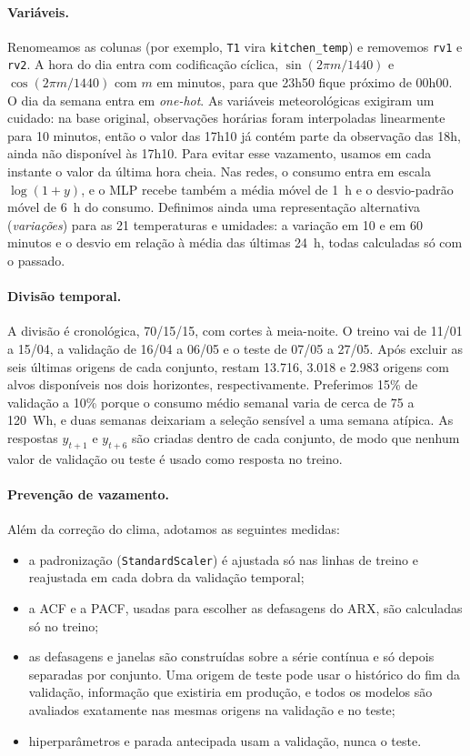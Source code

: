 \documentclass[11pt,a4paper]{article}
\begin{document}
\paragraph{Variáveis.} Renomeamos as colunas (por exemplo, \texttt{T1} vira \texttt{kitchen\_temp}) e removemos \texttt{rv1} e \texttt{rv2}. A hora do dia entra com codificação cíclica, $\sin(2\pi m/1440)$ e $\cos(2\pi m/1440)$ com $m$ em minutos, para que 23h50 fique próximo de 00h00. O dia da semana entra em \emph{one-hot}. As variáveis meteorológicas exigiram um cuidado: na base original, observações horárias foram interpoladas linearmente para 10 minutos, então o valor das 17h10 já contém parte da observação das 18h, ainda não disponível às 17h10. Para evitar esse vazamento, usamos em cada instante o valor da última hora cheia. Nas redes, o consumo entra em escala $\log(1+y)$, e o MLP recebe também a média móvel de 1~h e o desvio-padrão móvel de 6~h do consumo. Definimos ainda uma representação alternativa (\emph{variações}) para as 21 temperaturas e umidades: a variação em 10 e em 60 minutos e o desvio em relação à média das últimas 24~h, todas calculadas só com o passado.

\paragraph{Divisão temporal.} A divisão é cronológica, 70/15/15, com cortes à meia-noite. O treino vai de 11/01 a 15/04, a validação de 16/04 a 06/05 e o teste de 07/05 a 27/05. Após excluir as seis últimas origens de cada conjunto, restam 13.716, 3.018 e 2.983 origens com alvos disponíveis nos dois horizontes, respectivamente. Preferimos 15\% de validação a 10\% porque o consumo médio semanal varia de cerca de 75 a 120~Wh, e duas semanas deixariam a seleção sensível a uma semana atípica. As respostas $y_{t+1}$ e $y_{t+6}$ são criadas dentro de cada conjunto, de modo que nenhum valor de validação ou teste é usado como resposta no treino.

\paragraph{Prevenção de vazamento.} Além da correção do clima, adotamos as seguintes medidas:
\begin{itemize}\setlength\itemsep{0pt}
  \item a padronização (\texttt{StandardScaler}) é ajustada só nas linhas de treino e reajustada em cada dobra da validação temporal;
  \item a ACF e a PACF, usadas para escolher as defasagens do ARX, são calculadas só no treino;
  \item as defasagens e janelas são construídas sobre a série contínua e só depois separadas por conjunto. Uma origem de teste pode usar o histórico do fim da validação, informação que existiria em produção, e todos os modelos são avaliados exatamente nas mesmas origens na validação e no teste;
  \item hiperparâmetros e parada antecipada usam a validação, nunca o teste.
\end{itemize}
\end{document}
